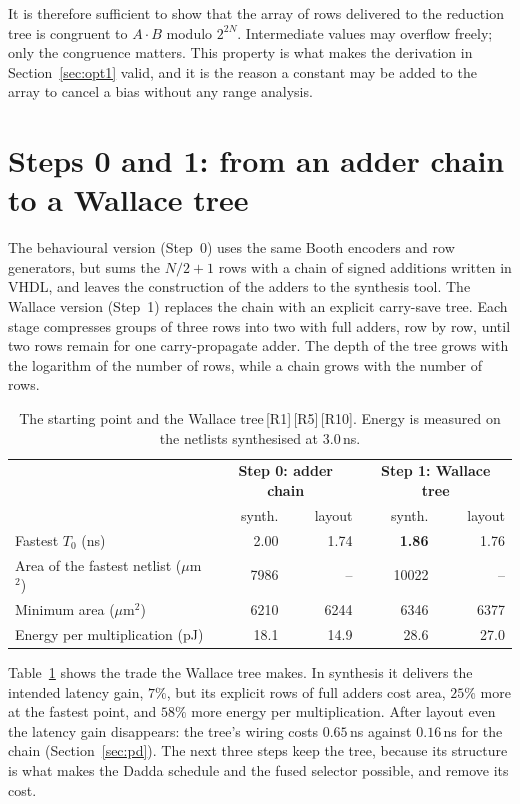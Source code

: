 \documentclass[11pt,a4paper]{article}
\newcommand{\src}[1]{\,{\footnotesize\color{accent}[#1]}}
\begin{document}
It is therefore sufficient to show that the array of rows delivered to the
reduction tree is congruent to $A\cdot B$ modulo $2^{2N}$. Intermediate values
may overflow freely; only the congruence matters. This property is what makes
the derivation in Section~\ref{sec:opt1} valid, and it is the reason a constant
may be added to the array to cancel a bias without any range analysis.

\section{Steps 0 and 1: from an adder chain to a Wallace tree}
\label{sec:step1}

The behavioural version (Step~0) uses the same Booth encoders and row
generators, but sums the $N/2+1$ rows with a chain of signed additions written
in VHDL, and leaves the construction of the adders to the synthesis tool. The
Wallace version (Step~1) replaces the chain with an explicit carry-save tree.
Each stage compresses groups of three rows into two with full adders, row by
row, until two rows remain for one carry-propagate adder. The depth of the
tree grows with the logarithm of the number of rows, while a chain grows with
the number of rows.

\begin{table}[!ht]
\centering\small
\begin{tabular}{@{}lrrrr@{}}
\toprule
 & \multicolumn{2}{c}{\textbf{Step 0: adder chain}} & \multicolumn{2}{c}{\textbf{Step 1: Wallace tree}} \\
 & synth. & layout & synth. & layout \\
\midrule
Fastest $T_0$ (ns)                 & 2.00 & 1.74 & \textbf{1.86} & 1.76 \\
Area of the fastest netlist ($\mu$m$^2$) & 7986 & -- & 10022 & -- \\
Minimum area ($\mu$m$^2$)          & 6210 & 6244 & 6346 & 6377 \\
Energy per multiplication (pJ)     & 18.1 & 14.9 & 28.6 & 27.0 \\
\bottomrule
\end{tabular}
\caption{The starting point and the Wallace tree\src{R1}\src{R5}\src{R10}.
Energy is measured on the netlists synthesised at $3.0$\,ns.}
\label{tab:step1}
\end{table}

Table~\ref{tab:step1} shows the trade the Wallace tree makes. In synthesis it
delivers the intended latency gain, $7\%$, but its explicit rows of full
adders cost area, $25\%$ more at the fastest point, and $58\%$ more energy per
multiplication. After layout even the latency gain disappears: the tree's
wiring costs $0.65$\,ns against $0.16$\,ns for the chain
(Section~\ref{sec:pd}). The next three steps keep the tree, because its
structure is what makes the Dadda schedule and the fused selector possible,
and remove its cost.
\end{document}
